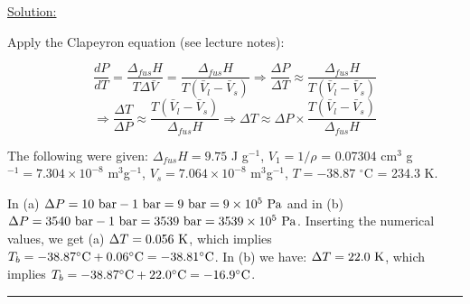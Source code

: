 \noindent
\underline{Solution:}

Apply the Clapeyron equation (see lecture notes):

$$\frac{dP}{dT} = \frac{\Delta_{fus}H}{T\Delta\bar{V}} = \frac{\Delta_{fus}H}{T\left(\bar{V}_l - \bar{V}_s\right)} \Rightarrow \frac{\Delta P}{\Delta T} \approx \frac{\Delta_{fus}H}{T\left(\bar{V}_l - \bar{V}_s\right)}$$
$$\Rightarrow \frac{\Delta T}{\Delta P} \approx \frac{T\left(\bar{V}_l - \bar{V}_s\right)}{\Delta_{fus}H} \Rightarrow \Delta T \approx \Delta P\times \frac{T\left(\bar{V}_l - \bar{V}_s\right)}{\Delta_{fus}H}$$

The following were given: $\Delta_{fus}H = 9.75$ J g$^{-1}$, $V_1 = 1 / \rho$ = 0.07304 cm$^3$ g$^{-1} = 7.304\times 10^{-8}$ m$^3$g$^{-1}$, $V_s = 7.064\times 10^{-8}$ m$^3$g$^{-1}$, $T = -38.87$ $^\circ$C = 234.3 K.

In (a) $\Delta P = 10\textnormal{ bar} - 1\textnormal{ bar} = 9\textnormal{ bar} = 9\times 10^5\textnormal{ Pa}$ and in (b) $\Delta P = 3540\textnormal{ bar} - 1\textnormal{ bar} = 3539\textnormal{ bar} = 3539\times 10^5\textnormal{ Pa}$. Inserting the numerical values, we get (a) $\Delta T = 0.056\textnormal{ K}$, which implies $T_b = -38.87^\circ\textnormal{C} + 0.06^\circ\textnormal{C} = -38.81^\circ\textnormal{C}$. In (b) we have: $\Delta T = 22.0\textnormal{ K}$, which implies $T_b = -38.87^\circ\textnormal{C} + 22.0^\circ\textnormal{C} = -16.9^\circ\textnormal{C}$.

\hrule\vspace{0.5cm}
